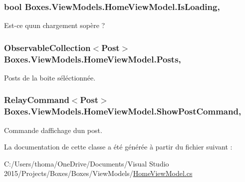 \subsubsection[{\texorpdfstring{Is\+Loading}{IsLoading}}]{\setlength{\rightskip}{0pt plus 5cm}bool Boxes.\+View\+Models.\+Home\+View\+Model.\+Is\+Loading\hspace{0.3cm}{\ttfamily [get]}, {\ttfamily [set]}}\hypertarget{class_boxes_1_1_view_models_1_1_home_view_model_a439e8cc0dbe399422652382d76ab674f}{}\label{class_boxes_1_1_view_models_1_1_home_view_model_a439e8cc0dbe399422652382d76ab674f}


Est-\/ce qu\textquotesingle{}un chargement s\textquotesingle{}opère ? 

\subsubsection[{\texorpdfstring{Posts}{Posts}}]{\setlength{\rightskip}{0pt plus 5cm}Observable\+Collection$<${\bf Post}$>$ Boxes.\+View\+Models.\+Home\+View\+Model.\+Posts\hspace{0.3cm}{\ttfamily [get]}, {\ttfamily [set]}}\hypertarget{class_boxes_1_1_view_models_1_1_home_view_model_a64608b92284b13db11abf18c5bca8a6b}{}\label{class_boxes_1_1_view_models_1_1_home_view_model_a64608b92284b13db11abf18c5bca8a6b}


Posts de la boite séléctionnée. 

\subsubsection[{\texorpdfstring{Show\+Post\+Command}{ShowPostCommand}}]{\setlength{\rightskip}{0pt plus 5cm}Relay\+Command$<${\bf Post}$>$ Boxes.\+View\+Models.\+Home\+View\+Model.\+Show\+Post\+Command\hspace{0.3cm}{\ttfamily [get]}, {}}\hypertarget{class_boxes_1_1_view_models_1_1_home_view_model_ae2f37a3465da061c17aa9694e8dbdf54}{}\label{class_boxes_1_1_view_models_1_1_home_view_model_ae2f37a3465da061c17aa9694e8dbdf54}


Commande d\textquotesingle{}affichage d\textquotesingle{}un post. 



La documentation de cette classe a été générée à partir du fichier suivant \+:\begin{DoxyCompactItemize}
\item 
C\+:/\+Users/thoma/\+One\+Drive/\+Documents/\+Visual Studio 2015/\+Projects/\+Boxes/\+Boxes/\+View\+Models/\hyperlink{_home_view_model_8cs}{Home\+View\+Model.\+cs}\end{DoxyCompactItemize}
